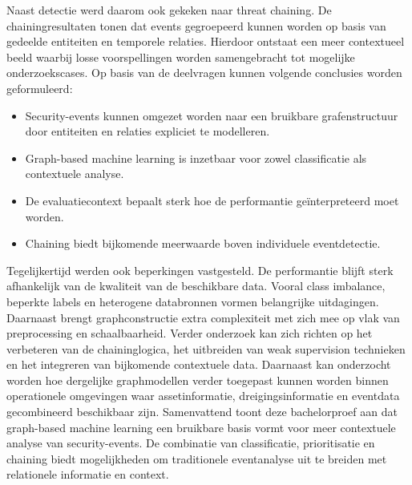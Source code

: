 \newline
\newline
Naast detectie werd daarom ook gekeken naar threat chaining. De chainingresultaten tonen dat events gegroepeerd kunnen worden op basis van gedeelde entiteiten en temporele relaties. Hierdoor ontstaat een meer contextueel beeld waarbij losse voorspellingen worden samengebracht tot mogelijke onderzoekscases.
\newline
\newline
Op basis van de deelvragen kunnen volgende conclusies worden geformuleerd:
\begin{itemize}
    \item Security-events kunnen omgezet worden naar een bruikbare grafenstructuur door entiteiten en relaties expliciet te modelleren.
    
    \item Graph-based machine learning is inzetbaar voor zowel classificatie als contextuele analyse.
    
    \item De evaluatiecontext bepaalt sterk hoe de performantie geïnterpreteerd moet worden.
    
    \item Chaining biedt bijkomende meerwaarde boven individuele eventdetectie.
\end{itemize}

Tegelijkertijd werden ook beperkingen vastgesteld. De performantie blijft sterk afhankelijk van de kwaliteit van de beschikbare data. Vooral class imbalance, beperkte labels en heterogene databronnen vormen belangrijke uitdagingen. Daarnaast brengt graphconstructie extra complexiteit met zich mee op vlak van preprocessing en schaalbaarheid.
\newline
\newline
Verder onderzoek kan zich richten op het verbeteren van de chaininglogica, het uitbreiden van weak supervision technieken en het integreren van bijkomende contextuele data. Daarnaast kan onderzocht worden hoe dergelijke graphmodellen verder toegepast kunnen worden binnen operationele omgevingen waar assetinformatie, dreigingsinformatie en eventdata gecombineerd beschikbaar zijn.
\newline
\newline
Samenvattend toont deze bachelorproef aan dat graph-based machine learning een bruikbare basis vormt voor meer contextuele analyse van security-events. De combinatie van classificatie, prioritisatie en chaining biedt mogelijkheden om traditionele eventanalyse uit te breiden met relationele informatie en context.





